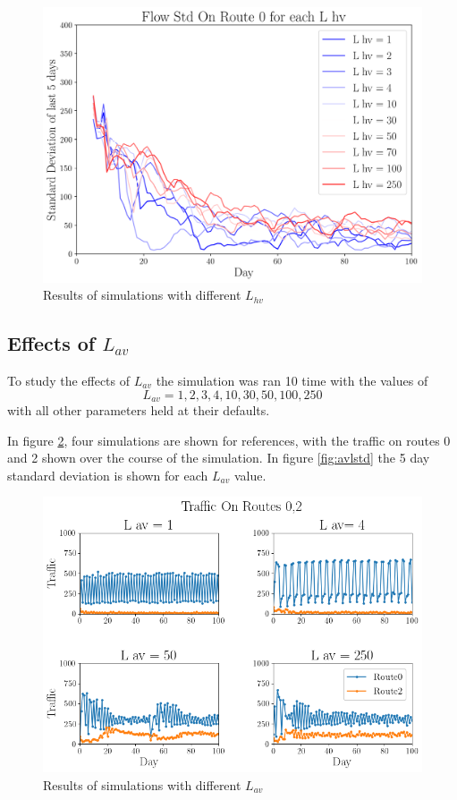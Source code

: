 \documentclass[12pt, a4paper, onecolumn]{article}
\begin{document}
\begin{figure}[h!]
	\centering
	\includegraphics[scale=.5]{hv_l_std.png}
	\caption{Results of simulations with different $L_{hv}$}
	\label{fig:hvlstd}
	\end{figure}

\subsection{Effects of $L_{av}$}
To study the effects of $L_{av}$ the simulation was ran 10 time with the values of
$$ L_{av} = 1, 2, 3, 4 , 10, 30, 50, 100, 250$$
with all other parameters held at their defaults.

In figure \ref{fig:avlgrid}, four simulations are shown for references, with the traffic on routes 0 and 2 shown over the course of the simulation. In figure \ref{fig:avlstd} the 5 day standard deviation is shown for each $L_{av}$ value.

\begin{figure}[h!]
	\centering
	\includegraphics[scale=.5]{av_l_grid.png}
	\caption{Results of simulations with different $L_{av}$}
	\label{fig:avlgrid}
	\end{figure}
\end{document}
